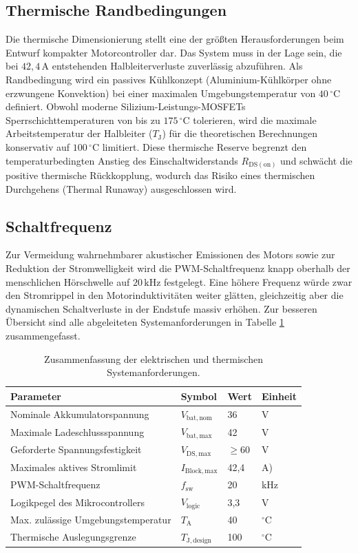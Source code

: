 \subsection{Thermische Randbedingungen}
Die thermische Dimensionierung stellt eine der größten Herausforderungen beim Entwurf kompakter Motorcontroller dar. Das System muss in der Lage sein, die bei $42{,}4\,\mathrm{A}$ entstehenden Halbleiterverluste zuverlässig abzuführen. Als Randbedingung wird ein passives Kühlkonzept (Aluminium-Kühlkörper ohne erzwungene Konvektion) bei einer maximalen Umgebungstemperatur von $40\,^\circ\mathrm{C}$ definiert. 
Obwohl moderne Silizium-Leistungs-MOSFETs Sperrschichttemperaturen von bis zu $175\,^\circ\mathrm{C}$ tolerieren, wird die maximale Arbeitstemperatur der Halbleiter ($T_\mathrm{J}$) für die theoretischen Berechnungen konservativ auf $100\,^\circ\mathrm{C}$ limitiert. Diese thermische Reserve begrenzt den temperaturbedingten Anstieg des Einschaltwiderstands $R_{\mathrm{DS(on)}}$ und schwächt die positive thermische Rückkopplung, wodurch das Risiko eines thermischen Durchgehens (Thermal Runaway) ausgeschlossen wird.

\subsection{Schaltfrequenz}
Zur Vermeidung wahrnehmbarer akustischer Emissionen des Motors sowie zur Reduktion der Stromwelligkeit wird die PWM-Schaltfrequenz knapp oberhalb der menschlichen Hörschwelle auf $20\,\mathrm{kHz}$ festgelegt. Eine höhere Frequenz würde zwar den Stromrippel in den Motorinduktivitäten weiter glätten, gleichzeitig aber die dynamischen Schaltverluste in der Endstufe massiv erhöhen.
Zur besseren Übersicht sind alle abgeleiteten Systemanforderungen in Tabelle \ref{tab:anforderungen} zusammengefasst.

\begin{table}[htbp]
\centering
\caption{Zusammenfassung der elektrischen und thermischen Systemanforderungen.}
\label{tab:anforderungen}
\begin{tabular}{llll}
\toprule
\textbf{Parameter} & \textbf{Symbol} & \textbf{Wert} & \textbf{Einheit} \\
\midrule
Nominale Akkumulatorspannung & $V_{\mathrm{bat,nom}}$ & 36 & V \\
Maximale Ladeschlussspannung & $V_{\mathrm{bat,max}}$ & 42 & V \\
Geforderte Spannungsfestigkeit & $V_{\mathrm{DS,max}}$ & $\ge 60$ & V \\
Maximales aktives Stromlimit & $I_{\mathrm{Block,max}}$ & 42,4 & A) \\
PWM-Schaltfrequenz & $f_{\mathrm{sw}}$ & 20 & kHz \\
Logikpegel des Mikrocontrollers & $V_{\mathrm{logic}}$ & 3,3 & V \\
Max. zulässige Umgebungstemperatur & $T_{\mathrm{A}}$ & 40 & $^\circ$C \\
Thermische Auslegungsgrenze & $T_{\mathrm{J,design}}$ & 100 & $^\circ$C \\
\bottomrule
\end{tabular}
\end{table}

